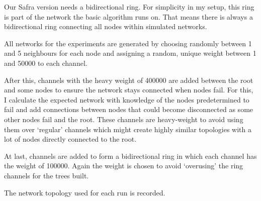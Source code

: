 Our Safra version needs a bidirectional ring.
For simplicity in my setup, this ring is part of the network the basic algorithm runs on.
That means there is always a bidirectional ring connecting all nodes within simulated networks.

All networks for the experiments are generated by choosing randomly between 1 and 5 neighbours for each node and assigning a random, unique weight between 1 and 50000 to each channel.

After this, channels with the heavy weight of 400000 are added between the root and some nodes to ensure the network stays connected when nodes fail.
For this, I calculate the expected network with knowledge of the nodes predetermined to fail and add connections between nodes that could become disconnected as some other nodes fail and the root.
These channels are heavy-weight to avoid using them over `regular' channels which might create highly similar topologies with a lot of nodes directly connected to the root.

At last, channels are added to form a bidirectional ring in which each channel has the weight of 100000.
Again the weight is chosen to avoid `overusing' the ring channels for the trees built.

The network topology used for each run is recorded.

